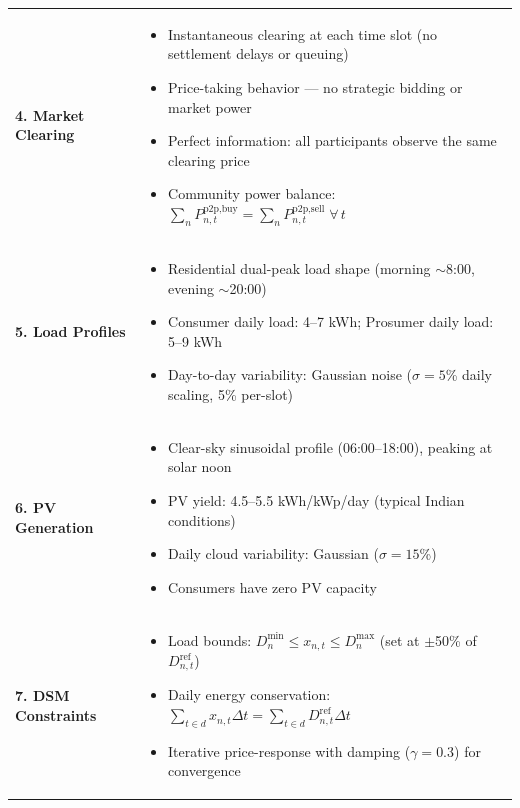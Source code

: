 \documentclass[11pt]{article}
\begin{document}
\begin{table}[h!]
\begin{tabular}{L{3.5cm} L{12cm}}
\textbf{4. Market Clearing} &
\begin{itemize} \setlength\itemsep{0pt}
  \item Instantaneous clearing at each time slot (no settlement delays or queuing)
  \item Price-taking behavior --- no strategic bidding or market power
  \item Perfect information: all participants observe the same clearing price
  \item Community power balance: $\sum_n P_{n,t}^{\text{p2p,buy}} = \sum_n P_{n,t}^{\text{p2p,sell}} \;\forall\, t$
\end{itemize} \\

\textbf{5. Load Profiles} &
\begin{itemize} \setlength\itemsep{0pt}
  \item Residential dual-peak load shape (morning $\sim$8:00, evening $\sim$20:00)
  \item Consumer daily load: 4--7 kWh; Prosumer daily load: 5--9 kWh
  \item Day-to-day variability: Gaussian noise ($\sigma = 5$\% daily scaling, 5\% per-slot)
\end{itemize} \\

\textbf{6. PV Generation} &
\begin{itemize} \setlength\itemsep{0pt}
  \item Clear-sky sinusoidal profile (06:00--18:00), peaking at solar noon
  \item PV yield: 4.5--5.5 kWh/kWp/day (typical Indian conditions)
  \item Daily cloud variability: Gaussian ($\sigma = 15$\%)
  \item Consumers have zero PV capacity
\end{itemize} \\

\textbf{7. DSM Constraints} &
\begin{itemize} \setlength\itemsep{0pt}
  \item Load bounds: $D_n^{\text{min}} \leq x_{n,t} \leq D_n^{\text{max}}$ (set at $\pm$50\% of $D_{n,t}^{\text{ref}}$)
  \item Daily energy conservation: $\sum_{t \in d} x_{n,t} \Delta t = \sum_{t \in d} D_{n,t}^{\text{ref}} \Delta t$
  \item Iterative price-response with damping ($\gamma = 0.3$) for convergence
\end{itemize} \\


\end{tabular}
\end{table}
\end{document}
